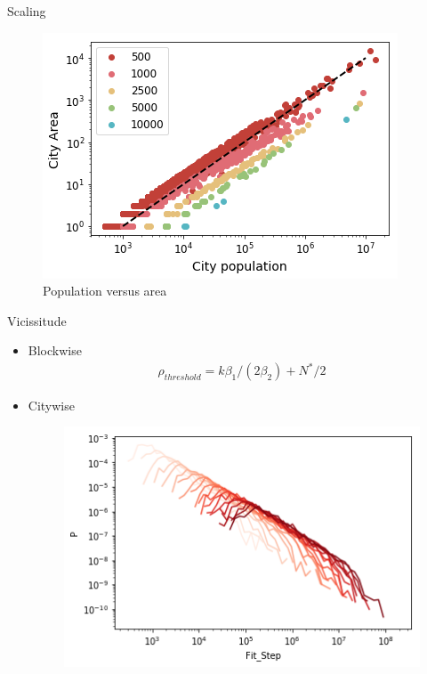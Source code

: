 \documentclass{beamer}
\begin{document}
\begin{frame}{Scaling}
  \begin{figure}
    \includegraphics[width = 0.8\linewidth]{pics/pop-area.png}
    \caption{Population versus area}
  \end{figure}
\end{frame}

\begin{frame}{Vicissitude}
  \begin{itemize}
    \item Blockwise
  \begin{align}\rho_{threshold} = k\beta_1/(2\beta_2)+N^*/2\end{align}
    \item Citywise
    \begin{figure}
      \includegraphics[width = 0.8\linewidth]{pics/step_number.png}
    \end{figure}
  \end{itemize}
\end{frame}
\end{document}
